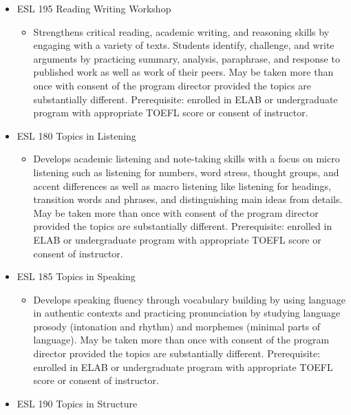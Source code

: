 \documentclass[
  letterpaper,
]{scrbook}
\providecommand{\tightlist}{%
  \setlength{\itemsep}{0pt}\setlength{\parskip}{0pt}}
\begin{document}
\begin{itemize}
\tightlist
\item
  ESL 195 Reading Writing Workshop

  \begin{itemize}
  \tightlist
  \item
    Strengthens critical reading, academic writing, and reasoning skills
    by engaging with a variety of texts. Students identify, challenge,
    and write arguments by practicing summary, analysis, paraphrase, and
    response to published work as well as work of their peers. May be
    taken more than once with consent of the program director provided
    the topics are substantially different. Prerequisite: enrolled in
    ELAB or undergraduate program with appropriate TOEFL score or
    consent of instructor.
  \end{itemize}
\item
  ESL 180 Topics in Listening

  \begin{itemize}
  \tightlist
  \item
    Develops academic listening and note-taking skills with a focus on
    micro listening such as listening for numbers, word stress, thought
    groups, and accent differences as well as macro listening like
    listening for headings, transition words and phrases, and
    distinguishing main ideas from details. May be taken more than once
    with consent of the program director provided the topics are
    substantially different. Prerequisite: enrolled in ELAB or
    undergraduate program with appropriate TOEFL score or consent of
    instructor.
  \end{itemize}
\item
  ESL 185 Topics in Speaking

  \begin{itemize}
  \tightlist
  \item
    Develops speaking fluency through vocabulary building by using
    language in authentic contexts and practicing pronunciation by
    studying language prosody (intonation and rhythm) and morphemes
    (minimal parts of language). May be taken more than once with
    consent of the program director provided the topics are
    substantially different. Prerequisite: enrolled in ELAB or
    undergraduate program with appropriate TOEFL score or consent of
    instructor.
  \end{itemize}
\item
  ESL 190 Topics in Structure


\end{itemize}
\end{document}
